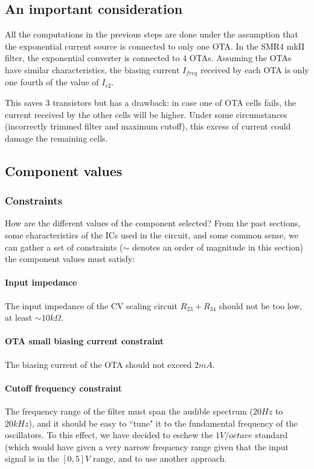 \documentclass[a4paper,11pt]{article}
\begin{document}
\subsection{An important consideration}

All the computations in the previous steps are done under the assumption that the exponential current source is connected to only one OTA. In the SMR4 mkII filter, the exponential converter is connected to 4 OTAs. Assuming the OTAs have similar characteristics, the biasing current $I_{freq}$ received by each OTA is only one fourth of the value of $I_{c2}$.

This saves 3 transistors but has a drawback: in case one of OTA cells fails, the current received by the other cells will be higher. Under some circumstances (incorrectly trimmed filter and maximum cutoff), this excess of current could damage the remaining cells.

\subsection{Component values}

\subsubsection{Constraints}

How are the different values of the component selected? From the past sections, some characteristics of the ICs used in the circuit, and some common sense, we can gather a set of constraints ($\sim$ denotes an order of magnitude in this section) the component values must satisfy:

\paragraph{Input impedance} The input impedance of the CV scaling circuit $R_{23} + R_{34}$ should not be too low, at least $\sim 10k \Omega$.

\paragraph{OTA small biasing current constraint} The biasing current of the OTA should not exceed $2mA$.

\paragraph{Cutoff frequency constraint} The frequency range of the filter must span the audible spectrum ($20 Hz$ to $20kHz$), and it should be easy to ``tune" it to the fundamental frequency of the oscillators. To this effect, we have decided to eschew the $1 V/octave$ standard (which would have given a very narrow frequency range given that the input signal is in the $[0, 5]V$ range, and to use another approach.
\end{document}
